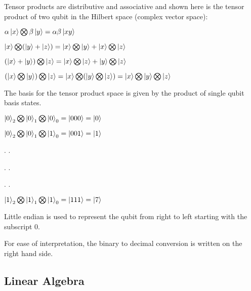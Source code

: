 \documentclass{article}
\begin{document}
\noindent
Tensor products are distributive and associative and shown here is the tensor product of two qubit in the Hilbert space (complex vector space)\cite{noauthor_lecture_nodate}:
\vspace{5mm}


\qquad $\alpha\ket{x} \bigotimes \beta\ket{y} = \alpha\beta\ket{xy}$
\vspace{5mm}


\qquad $\ket{x} \bigotimes (\ket{y} + \ket{z}) = \ket{x}\bigotimes \ket{y} + \ket{x}\bigotimes\ket{z}$
\vspace{5mm}


\qquad $(\ket{x} + \ket{y}) \bigotimes \ket{z} = \ket{x}\bigotimes \ket{z} + \ket{y}\bigotimes\ket{z}$
\vspace{5mm}


\qquad $(\ket{x} \bigotimes \ket{y}) \bigotimes \ket{z} = \ket{x} \bigotimes (\ket{y} \bigotimes\ket{z}) = \ket{x} \bigotimes \ket{y} \bigotimes\ket{z}$
\vspace{10mm}

The basis for the tensor product space is given by the product of single qubit basis states.
\vspace{5mm}

\qquad $\ket{0}_2 \bigotimes \ket{0}_1 \bigotimes \ket{0}_0 = \ket{000} = \ket{0}$
\vspace{5mm}

\qquad $\ket{0}_2 \bigotimes \ket{0}_1 \bigotimes \ket{1}_0 = \ket{001} = \ket{1}$
\vspace{5mm}

\qquad \qquad \qquad . \qquad \qquad .

\qquad \qquad \qquad . \qquad \qquad .

\qquad \qquad \qquad . \qquad \qquad .

\qquad $\ket{1}_2 \bigotimes \ket{1}_1 \bigotimes \ket{1}_0 = \ket{111} = \ket{7}$
\vspace{5mm}

Little endian is used to represent the qubit from right to left starting with the subscript 0.

For ease of interpretation, the binary to decimal conversion is written on the right hand side. 
\pagebreak





\subsection{Linear Algebra}
\vspace{5mm}
\end{document}
